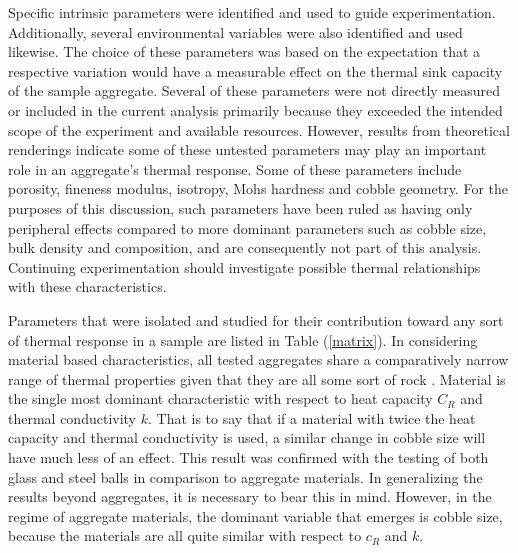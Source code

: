 Specific intrinsic parameters were identified and used to guide experimentation. Additionally, several environmental variables were also identified and used likewise. The choice of these parameters was based on the expectation that a respective variation would have a measurable effect on the thermal sink capacity of the sample aggregate. Several of these parameters were not directly measured or included in the current analysis primarily because they exceeded the intended scope of the experiment and available resources. However, results from theoretical renderings indicate some of these untested parameters may play an important role in an aggregate's thermal response. Some of these parameters include porosity, fineness modulus, isotropy, Mohs hardness and cobble geometry. For the purposes of this discussion, such parameters have been ruled as having only peripheral effects compared to more dominant parameters such as cobble size, bulk density and composition, and are consequently not part of this analysis. Continuing experimentation should investigate possible thermal relationships with these characteristics. 

Parameters that were isolated and studied for their contribution toward any sort of thermal response in a sample are listed in Table (\ref{matrix}). In considering material based characteristics, all tested aggregates share a comparatively narrow range of thermal properties given that they are all some sort of rock \citep{heatxfer}. Material is the single most dominant characteristic with respect to heat capacity $C_{R}$ and thermal conductivity $k$. That is to say that if a material with twice the heat capacity and thermal conductivity is used, a similar change in cobble size will have much less of an effect. This result was confirmed with the testing of both glass and steel balls in comparison to aggregate materials. In generalizing the results beyond aggregates, it is necessary to bear this in mind. However, in the regime of aggregate materials, the dominant variable that emerges is cobble size, because the materials are all quite similar with respect to $c_{R}$ and $k$. 

